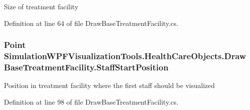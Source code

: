 Size of treatment facility 



Definition at line 64 of file Draw\+Base\+Treatment\+Facility.\+cs.

\subsubsection[{\texorpdfstring{Staff\+Start\+Position}{StaffStartPosition}}]{\setlength{\rightskip}{0pt plus 5cm}Point Simulation\+W\+P\+F\+Visualization\+Tools.\+Health\+Care\+Objects.\+Draw\+Base\+Treatment\+Facility.\+Staff\+Start\+Position\hspace{0.3cm}{\ttfamily [get]}}\hypertarget{class_simulation_w_p_f_visualization_tools_1_1_health_care_objects_1_1_draw_base_treatment_facility_a258b993c06163cc3da0d3beb91b6e344}{}\label{class_simulation_w_p_f_visualization_tools_1_1_health_care_objects_1_1_draw_base_treatment_facility_a258b993c06163cc3da0d3beb91b6e344}


Position in treatment facility where the first staff should be visualized 



Definition at line 98 of file Draw\+Base\+Treatment\+Facility.\+cs.

